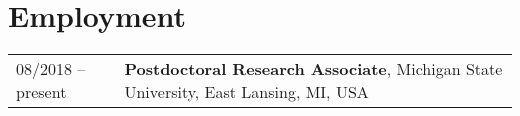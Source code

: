 \section*{Employment}
\begin{tabular}{p{} p{}}
08/2018 -- present & \textbf{Postdoctoral Research Associate},
		              Michigan State University, East Lansing, MI, USA \\
\end{tabular}
